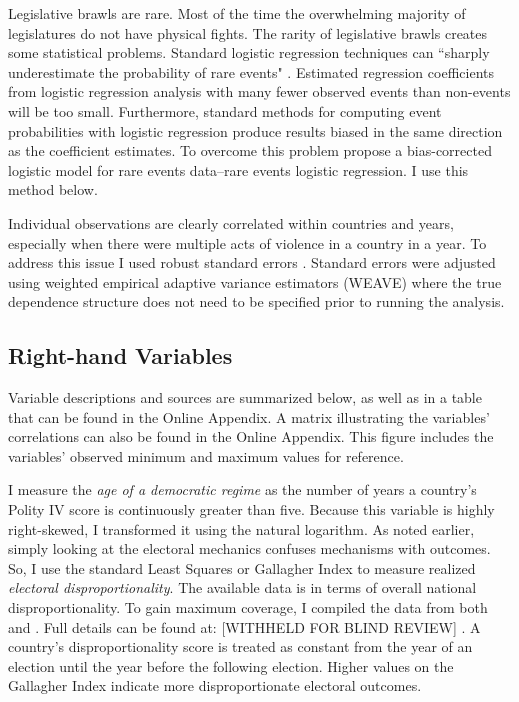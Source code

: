 \documentclass[a4paper]{article}\usepackage[]{graphicx}\usepackage[]{color}
\begin{document}
Legislative brawls are rare. Most of the time the overwhelming majority of legislatures do not have physical fights. The rarity of legislative brawls creates some statistical problems. Standard logistic regression techniques can ``sharply underestimate the probability of rare events" \cite[137]{KingRareEventsPA2001}. Estimated regression coefficients from logistic regression analysis with many fewer observed events than non-events will be too small. Furthermore, standard methods for computing event probabilities with logistic regression produce results biased in the same direction as the coefficient estimates. To overcome this problem \cite{KingRareEvents2001,KingRareEventsPA2001} propose a bias-corrected logistic model for rare events data--rare events logistic regression. I use this method below.

Individual observations are clearly correlated within countries and years, especially when there were multiple acts of violence in a country in a year. To address this issue I used robust standard errors \citep{Golder2006, Mainwaring2007}. Standard errors were adjusted using \cite{Lumley1999} weighted empirical adaptive variance estimators (WEAVE) where the true dependence structure does not need to be specified prior to running the analysis.

\subsection*{Right-hand Variables}

Variable descriptions and sources are summarized below, as well as in a table that can be found in the Online Appendix. A matrix illustrating the variables' correlations can also be found in the Online Appendix. This figure includes the variables' observed minimum and maximum values for reference.

I measure the {\emph{age of a democratic regime}} as the number of years a country's Polity IV score \citep{Marshall2009} is continuously greater than five. Because this variable is highly right-skewed, I transformed it using the natural logarithm. As noted earlier, simply looking at the electoral mechanics confuses mechanisms with outcomes. So, I use the standard Least Squares or Gallagher Index \citep{Gallagher1991} to measure realized {\emph{electoral disproportionality}}. The available data is in terms of overall national disproportionality. To gain maximum coverage, I compiled the data from both \cite{Gallagher2012} and \cite{Carey2011}. Full details can be found at: [WITHHELD FOR BLIND REVIEW]
.
A country's disproportionality score is treated as constant from the year of an election until the year before the following election. Higher values on the Gallagher Index indicate more disproportionate electoral outcomes.
\end{document}
